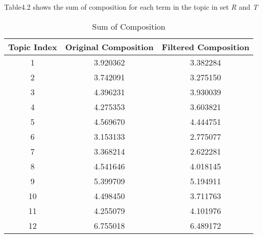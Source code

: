 \documentclass[11pt,twoside]{report}
\begin{document}
Table4.2 shows the sum of composition for each term in the topic in set  \textit{R} and \textit{T}
\begin{table}[ht]
\caption{Sum of Composition}
\centering
\begin{tabular}{c c c}
\hline\hline
Topic Index & Original Composition & Filtered Composition\\
\hline
1 & 3.920362 & 3.382284\\
2 & 3.742091 & 3.275150\\
3 & 4.396231 & 3.930039\\
4 & 4.275353 & 3.603821\\
5 & 4.569670 & 4.444751\\
6 & 3.153133 & 2.775077\\
7 & 3.368214 & 2.622281\\
8 & 4.541646 & 4.018145\\
9 & 5.399709 & 5.194911\\
10 & 4.498450 & 3.711763\\
11 & 4.255079 & 4.101976\\
12 & 6.755018 & 6.489172\\
\hline
\end{tabular}
\label{table:Topic Composition}
\end{table}

\end{document}
